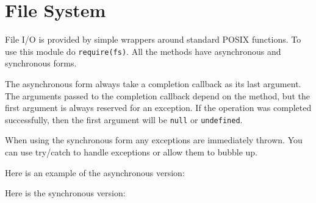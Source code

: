 \section{File System}\label{file-system}

\begin{Shaded}
\begin{Highlighting}[]
 
\end{Highlighting}
\end{Shaded}

File I/O is provided by simple wrappers around standard POSIX functions.
To use this module do
\texttt{require(\textquotesingle{}fs\textquotesingle{})}. All the
methods have asynchronous and synchronous forms.

The asynchronous form always take a completion callback as its last
argument. The arguments passed to the completion callback depend on the
method, but the first argument is always reserved for an exception. If
the operation was completed successfully, then the first argument will
be \texttt{null} or \texttt{undefined}.

When using the synchronous form any exceptions are immediately thrown.
You can use try/catch to handle exceptions or allow them to bubble up.

Here is an example of the asynchronous version:

\begin{Shaded}
\begin{Highlighting}[]
 \NormalTok{(}\NormalTok{);}

\NormalTok{(}\NormalTok{, } 
    
  \NormalTok{(}\NormalTok{);}
\NormalTok{\});}
\end{Highlighting}
\end{Shaded}

Here is the synchronous version:

\begin{Shaded}
\begin{Highlighting}[]
 \NormalTok{(}\NormalTok{);}

\NormalTok{(}\NormalTok{);}
\NormalTok{(}\NormalTok{);}
\end{Highlighting}
\end{Shaded}

